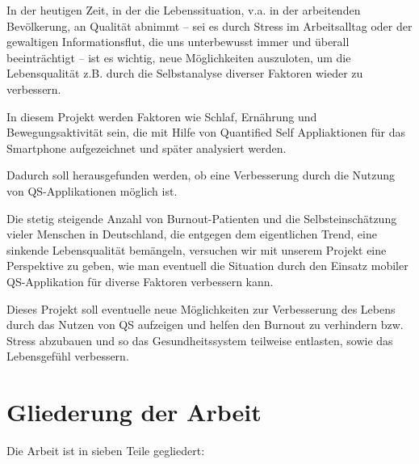 In der heutigen Zeit, in der die Lebenssituation, v.a. in der arbeitenden Bevölkerung, an Qualität abnimmt – sei es durch Stress im Arbeitsalltag oder der gewaltigen Informationsflut, die uns unterbewusst immer und überall beeinträchtigt – ist es wichtig, neue Möglichkeiten auszuloten, um die Lebensqualität z.B. durch die Selbstanalyse diverser Faktoren wieder zu verbessern. 

In diesem Projekt werden Faktoren wie Schlaf, Ernährung und Bewegungsaktivität sein, die mit Hilfe von Quantified Self Appliaktionen für das Smartphone aufgezeichnet und später analysiert werden. 

Dadurch soll herausgefunden werden, ob eine Verbesserung durch die Nutzung von QS-Applikationen möglich ist.

Die stetig steigende Anzahl von Burnout-Patienten und die Selbsteinschätzung vieler Menschen in Deutschland, die entgegen dem eigentlichen Trend, eine sinkende Lebensqualität bemängeln, versuchen wir mit unserem Projekt eine Perspektive zu geben, wie man eventuell die Situation durch den Einsatz mobiler QS-Applikation für diverse Faktoren verbessern kann. 

Dieses Projekt soll eventuelle neue Möglichkeiten zur Verbesserung des Lebens durch das Nutzen von QS aufzeigen und helfen den Burnout zu verhindern bzw. Stress abzubauen und so das Gesundheitssystem teilweise entlasten, sowie das Lebensgefühl verbessern. 

\section{Gliederung der Arbeit}
\label{ch:Einleitung:sec:gliederung-der-arbeit}

Die Arbeit ist in sieben Teile gegliedert:

